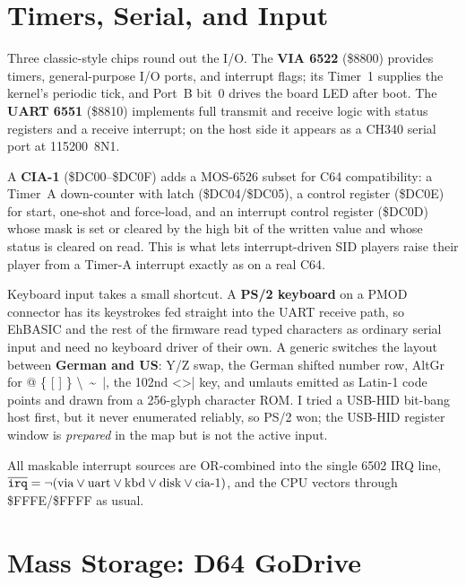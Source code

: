 \documentclass[11pt,a4paper]{article}
\newcommand{\reg}[1]{{\ttfamily #1}}
\begin{document}
\section{Timers, Serial, and Input}\label{sec:io}

Three classic-style chips round out the I/O. The \textbf{VIA 6522}
(\reg{\$8800}) provides timers, general-purpose I/O ports, and interrupt
flags; its Timer~1 supplies the kernel's periodic tick, and Port~B bit~0
drives the board LED after boot. The \textbf{UART 6551} (\reg{\$8810})
implements full transmit and receive logic with status registers and a
receive interrupt; on the host side it appears as a CH340 serial port at
115200~8N1.

A \textbf{CIA-1} (\reg{\$DC00--\$DC0F}) adds a MOS-6526 subset for C64
compatibility: a Timer~A down-counter with latch (\reg{\$DC04/\$DC05}), a
control register (\reg{\$DC0E}) for start, one-shot and force-load, and an
interrupt control register (\reg{\$DC0D}) whose mask is set or cleared by
the high bit of the written value and whose status is cleared on read.
This is what lets interrupt-driven SID players raise their player from a
Timer-A interrupt exactly as on a real C64.

Keyboard input takes a small shortcut. A \textbf{PS/2 keyboard} on a PMOD
connector has its keystrokes fed straight into the UART receive path, so
EhBASIC and the rest of the firmware read typed characters as ordinary
serial input and need no keyboard driver of their own. A generic switches
the layout between \textbf{German and US}: Y/Z swap, the German shifted
number row, AltGr for \reg{@ \{ [ ] \} \textbackslash\ \textasciitilde\ |},
the 102nd \reg{<>|} key, and umlauts emitted as Latin-1 code points and
drawn from a 256-glyph character ROM. I tried a USB-HID bit-bang host
first, but it never enumerated reliably, so PS/2 won; the USB-HID register
window is \emph{prepared} in the map but is not the active input.

All maskable interrupt sources are OR-combined into the single 6502
\reg{IRQ} line, $\overline{\text{\reg{irq}}} = \lnot(\text{via} \lor
\text{uart} \lor \text{kbd} \lor \text{disk} \lor \text{cia-1})$, and the
CPU vectors through \reg{\$FFFE/\$FFFF} as usual.

\section{Mass Storage: D64 GoDrive}
\end{document}
